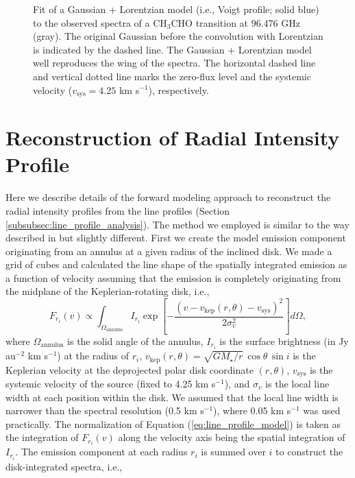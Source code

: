 \documentclass[linenumbers, twocolumn, twocolappendix, astrosymb, times]{aastex631}
\newcommand{\acetaldehyde}{CH$_3$CHO\xspace}
\begin{document}
\begin{figure}
\caption{Fit of a Gaussian + Lorentzian model (i.e., Voigt profile; solid blue) to the observed spectra of a \acetaldehyde transition at 96.476 GHz (gray). The original Gaussian before the convolution with Lorentzian is indicated by the dashed line. The Gaussian + Lorentzian model well reproduces the wing of the spectra. The horizontal dashed line and vertical dotted line marks the zero-flux level and the systemic velocity ($v_\mathrm{sys} = 4.25$ km s$^{-1}$), respectively.}
\label{fig:Lorentzian_demo}
\end{figure}

\section{Reconstruction of Radial Intensity Profile}\label{appendix:line_profile_analysis_method}
Here we describe details of the forward modeling approach to reconstruct the radial intensity profiles from the line profiles (Section \ref{subsubsec:line_profile_analysis}). The method we employed is similar to the way described in \citet{Bosman2021} but slightly different. First we create the model emission component originating from an annulus at a given radius of the inclined disk. We made a grid of cubes and calculated the line shape of the spatially integrated emission as a function of velocity assuming that the emission is completely originating from the midplane of the Keplerian-rotating disk, i.e.,
\begin{equation}\label{eq:line_profile_model}
    F_{r_i}(v) \propto \int_{\Omega_\mathrm{annulus}}I_{r_i}\exp\left[- \frac{(v - v_\mathrm{kep}(r, \theta) - v_\mathrm{sys})^2}{2\sigma_v^2}\right]d\Omega,
\end{equation}
where $\Omega_\mathrm{annulus}$ is the solid angle of the annulus, $I_{r_i}$ is the surface brightness (in Jy au$^{-2}$ km s$^{-1}$) at the radius of $r_i$, $v_\mathrm{kep}(r, \theta) = \sqrt{GM_\star/r}\,\cos\theta\,\sin i$ is the Keplerian velocity at the deprojected polar disk coordinate $(r, \theta)$, $v_\mathrm{sys}$ is the systemic velocity of the source (fixed to 4.25 km s$^{-1}$), and $\sigma_v$ is the local line width at each position within the disk. We assumed that the local line width is narrower than the spectral resolution (0.5 km s$^{-1}$), where 0.05 km s$^{-1}$ was used practically. The normalization of Equation (\ref{eq:line_profile_model}) is taken as the integration of $F_{r_i}(v)$ along the velocity axis being the spatial integration of $I_{r_i}$. The emission component at each radius $r_i$ is summed over $i$ to construct the disk-integrated spectra, i.e., 
\end{document}
